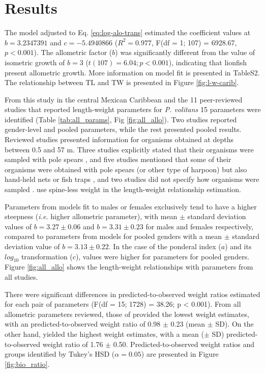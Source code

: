 \documentclass[fleqn,10pt,lineno]{wlpeerj} %
\begin{document}
\section*{Results}

The model adjusted to Eq. \ref{eq:log-alo-trans} estimated the
coefficient values at \(b = 3.2347391\) and \(c = -5.4940866\)
(\(R^2 = 0.977\), F(df = 1; 107) = 6928.67, \(p < 0.001\)). The
allometric factor (\(b\)) was significantly different from the value of
isometric growth of \(b = 3\) (\(t(107) = 6.04; p<0.001\)), indicating
that lionfish present allometric growth. More information on model fit
is presented in TableS2. The relationship between TL and TW is presented
in Figure \ref{fig:l-w-carib}.

From this study in the central Mexican Caribbean and the 11
peer-reviewed studies that reported length-weight parameters for
\emph{P. volitans} 15 parameters were identified (Table
\ref{tab:all_params}, Fig \ref{fig:all_allo}). Two studies
\citep{aguilarperera_2016,fogg_2013} reported gender-level and pooled
parameters, while the rest presented pooled results. Reviewed studies
presented information for organisms obtained at depths between 0.5 and
57 m. Three studies explicitly stated that their organisms were sampled
with pole spears \citep{aguilarperera_2016,chin_2016,dahl_2014}, and
five studies mentioned that some of their organisms were obtained with
pole spears (or other type of harpoon) but also hand-held nets or fish
traps
\citep{sandel_2015,barbour_2011,fogg_2013,edwards_2014,sabidoitza_2016,toledohernndez_2014},
and two studies did not specify how organisms were sampled
\citep{deleon_2013,darling_2011}. \citet{fogg_2013} use spine-less
weight in the length-weight relationship estimation.

Parameters from models fit to males or females exclusively tend to have
a higher steepness (\emph{i.e.} higher allometric parameter), with mean
\(\pm\) standard deviation values of \(b = 3.27 \pm 0.06\) and
\(b = 3.31 \pm 0.23\) for males and females respectively, compared to
parameters from models for pooled genders with a mean \(\pm\) standard
deviation value of \(b = 3.13 \pm 0.22\). In the case of the ponderal
index (\(a\)) and its \(log_{10}\) transformation (\(c\)), values were
higher for parameters for pooled genders. Figure \ref{fig:all_allo}
shows the length-weight relationships with parameters from all studies.

There were significant differences in predicted-to-observed weight
ratios estimated for each pair of parameters (F(df = 15; 1728) = 38.26;
p \textless{} 0.001). From all allometric parameters reviewed, those of
\citet{edwards_2014} provided the lowest weight estimates, with an
predicted-to-observed weight ratio of 0.98 \(\pm\) 0.23 (mean \(\pm\)
SD). On the other hand,\citet{barbour_2011} yielded the highest weight
estimates, with a mean (\(\pm\) SD) predicted-to-observed weight ratio
of 1.76 \(\pm\) 0.50. Predicted-to-observed weight ratios and groups
identified by Tukey's HSD (\(\alpha = 0.05\)) are presented in Figure
\ref{fig:bio_ratio}.
\end{document}
